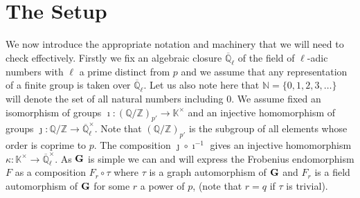 \documentclass[eqthmnum]{jt-calcs}
\newcommand{\Ql}{\ensuremath{\overline{\mathbb{Q}}_{\ell}}}
\renewcommand{\cref}{\Cref}
\begin{document}
\section{The Setup}\label{sec:the-setup}
\begin{pa}
We now introduce the appropriate notation and machinery that we will need to check \cref{prop:A} effectively. Firstly we fix an algebraic closure $\Ql$ of the field of $\ell$-adic numbers with $\ell$ a prime distinct from $p$ and we assume that any representation of a finite group is taken over $\Ql$. Let us also note here that $\mathbb{N} = \{0,1,2,3,\dots\}$ will denote the set of all natural numbers including 0. We assume fixed an isomorphism of groups $\imath : (\mathbb{Q}/\mathbb{Z})_{p'} \to \mathbb{K}^{\times}$ and an injective homomorphism of groups $\jmath : \mathbb{Q}/\mathbb{Z} \to \overline{\mathbb{Q}}_{\ell}^{\times}$. Note that $(\mathbb{Q}/\mathbb{Z})_{p'}$ is the subgroup of all elements whose order is coprime to $p$. The composition $\jmath \circ \imath^{-1}$ gives an injective homomorphism $\kappa : \mathbb{K}^{\times} \to \overline{\mathbb{Q}}_{\ell}^{\times}$. As $\mathbf{G}$ is simple we can and will express the Frobenius endomorphism $F$ as a composition $F_r\circ\tau$ where $\tau$ is a graph automorphism of $\mathbf{G}$ and $F_r$ is a field automorphism of $\mathbf{G}$ for some $r$ a power of $p$, (note that $r = q$ if $\tau$ is trivial).
\end{pa}
\end{document}
